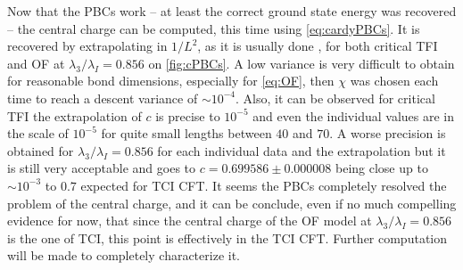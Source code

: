 	Now that the PBCs work -- at least the correct ground state energy was recovered -- the central charge can be computed, this time using \eqref{eq:cardyPBCs}. It is recovered by extrapolating in $1/L^2$, as it is usually done \cite{milsted2017}, for both critical TFI and OF at $\lambda_3/\lambda_I=0.856$ on \autoref{fig:cPBCs}. A low variance is very difficult to obtain for reasonable bond dimensions, especially for \eqref{eq:OF}, then $\chi$ was chosen each time to reach a descent variance of $\sim 10^{-4}$. Also, it can be observed for critical TFI the extrapolation of $c$ is precise to $10^{-5}$ and even the individual values are in the scale of $10^{-5}$ for quite small lengths between $40$ and $70$. A worse precision is obtained for $\lambda_3/\lambda_I=0.856$ for each individual data and the extrapolation but it is still very acceptable and goes to $c=0.699586\pm0.000008$ being close up to $\sim 10^{-3}$ to $0.7$ expected for TCI CFT. It seems the PBCs completely resolved the problem of the central charge, and it can be conclude, even if no much compelling evidence for now, that since the central charge of the OF model at $\lambda_3/\lambda_I=0.856$ is the one of TCI, this point is effectively in the TCI CFT. Further computation will be made to completely characterize it.

